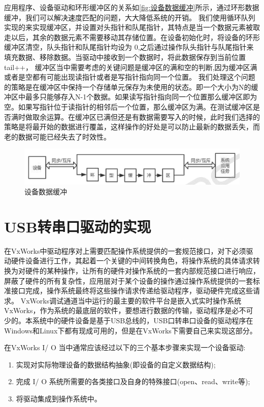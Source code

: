 	
  应用程序、设备驱动和环形缓冲区的关系如\autoref{fig:设备数据缓冲}所示，通过环形数据缓冲，我们可以解决速度匹配的问题，大大降低系统的开销。
	我们使用循环队列实现的来实现缓冲区，并设置对头指针和队尾指针，其特点是当一个数据元素被取走以后，其余的数据元素不需要移动其存储位置。在设备初始化时，将设备的环形缓冲区清空，队头指针和队尾指针均设为 0,之后通过操作队头指针与队尾指针来填充数据、移除数据。当驱动中接收到一个数据时，将此数据保存到当前位置 tail++，
	缓冲区当中需要考虑的关键问题是缓冲区的满和空的判断,因为缓冲区满或者是空都有可能出现读指针或者是写指针指向同一个位置。 我们处理这个问题的策略是在缓冲区中保持一个存储单元保存为未使用的状态。即一个大小为N的缓冲区中最多只能够存入N-1个数据。如果读写指针指向同一个位置那么缓冲区即为空。如果写指针位于读指针的相邻后一个位置，那么缓冲区为满。在测试缓冲区是否满时做取余运算。在缓冲区已满但还是有数据需要写入的时候，此时我们选择的策略是将最开始的数据进行覆盖，这样操作的好处是可以防止最新的数据丢失，而老的数据可能已经失去了时效性。

\begin{figure}[!h]
\centering
\includegraphics[width=.9\textwidth]{./graphics/Dev-Data-Buf.pdf}
\caption{设备数据缓冲}\label{fig:设备数据缓冲}
\end{figure}


\section{USB转串口驱动的实现}
	在VxWorks中驱动程序对上需要匹配操作系统提供的一套规范接口，对下必须驱动硬件设备进行工作，其起着一个关键的中间转换角色，将操作系统的具体请求转换为对硬件的某种操作，让所有的硬件对操作系统的一套内部规范接口进行响应，屏蔽了硬件的所有复杂性，应用层对于某个设备的操作通过操作系统提供的一套标准接口完成，操作系统最终将这些操作请求传递给驱动程序，驱动硬件完成这些请求。	
	VxWorks调试通道当中运行的最主要的软件平台是嵌入式实时操作系统VxWorks，作为系统的最底层的软件，要想进行数据的传输，驱动程序是必不可少的。本系统中的硬件设备是基于USB总线的，USB口转串口设备的驱动程序在Windows和Linux下都有现成可用的，但是在VxWorks下需要自己来实现这部分。
	
	在VxWorks I/ O 当中通常应该经过以下的三个基本步骤来实现一个设备驱动:
\begin{enumerate}
\item 实现对实际物理设备的数据结构抽象(即设备的自定义数据结构);
\item 完成 I/ O 系统所需要的各类接口及自身的特殊接口(open、read、write等);
\item 将驱动集成到操作系统中。
\end{enumerate}

